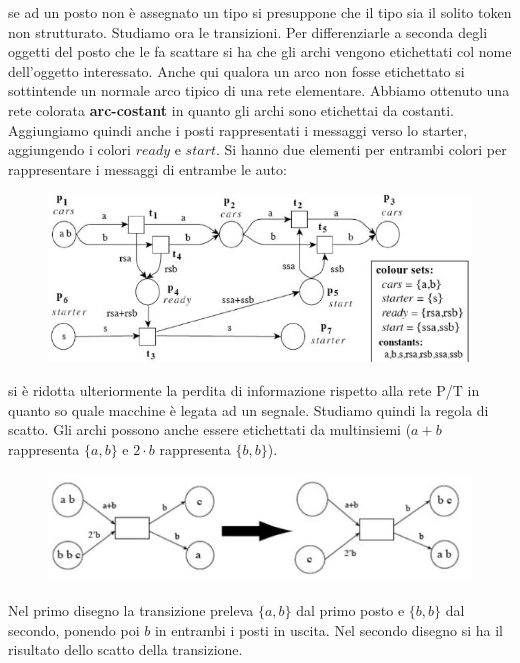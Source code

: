 \documentclass[a4paper,12pt, oneside]{book}
\begin{document}
\begin{esempio}
\begin{figure}[H]
  \end{figure}
  se ad un posto non è assegnato un tipo si presuppone che il tipo sia il solito
  token non strutturato. Studiamo ora le transizioni. Per differenziarle a
  seconda degli oggetti del posto che le fa scattare si ha che gli archi vengono
  etichettati col nome dell'oggetto interessato. Anche qui qualora un arco non
  fosse etichettato si sottintende un normale arco tipico di una rete
  elementare. Abbiamo ottenuto una rete colorata \textbf{arc-costant} in quanto
  gli archi sono etichettai da  costanti.\\
  Aggiungiamo quindi anche i posti rappresentati i messaggi verso lo starter,
  aggiungendo i colori $ready$ e $start$. Si hanno due elementi per entrambi
  colori per rappresentare i messaggi di entrambe le auto:
  \begin{figure}[H]
    \centering
    \includegraphics[scale = 0.6]{img/c9.jpg}
  \end{figure}
  si è ridotta ulteriormente la perdita di informazione rispetto alla rete P/T
  in quanto so quale macchine è legata ad un segnale.
  \newpage
  Studiamo quindi la regola di scatto. Gli archi possono anche essere
  etichettati da multinsiemi ($a+b$ rappresenta $\{a,b\}$ e $2\cdot b$
  rappresenta $\{b,b\}$).
  \begin{figure}[H]
    \centering
    \includegraphics[scale = 0.6]{img/c10.jpg}
  \end{figure}
  Nel primo disegno la transizione preleva $\{a,b\}$ dal primo posto e
  $\{b,b\}$ dal secondo, ponendo poi $b$ in entrambi i posti in uscita. Nel
  secondo disegno si ha il risultato dello scatto della transizione.\\

\end{esempio}
\end{document}
